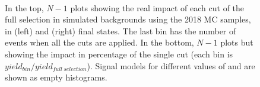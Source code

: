 \begin{figure}[t]
  \noindent
  \\
  \caption{In the top, $N-1$ plots showing the real impact of each cut of the full selection in simulated backgrounds using the 2018 MC samples,
    in \eex (left) and \mmx (right) final states. The last bin has the number of events when all the cuts are applied.
    In the bottom, $N-1$ plots but showing the impact in percentage of the single cut (each bin is $yield_{bin}/yield_{full\:selection}$).
    Signal models for different values of \mhnl and \mixpar
    are shown as empty histograms.}
  \label{fig:cutflow2}
\end{figure}
\vspace{2mm}

